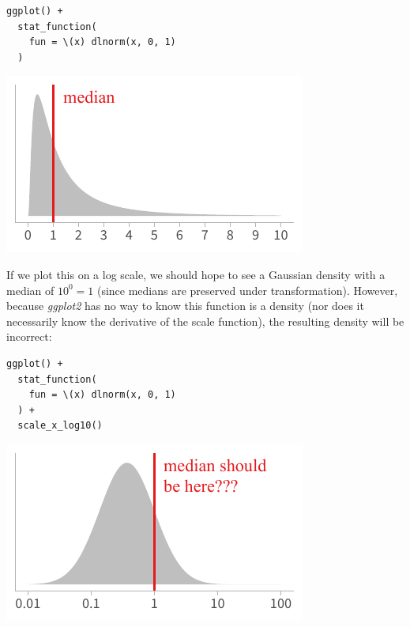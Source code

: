 \documentclass[journal]{vgtc}                     %
\begin{document}
\noindent
\begin{minipage}{.5\columnwidth}
\small
\begin{verbatim}
ggplot() +
  stat_function(
    fun = \(x) dlnorm(x, 0, 1)
  )
\end{verbatim}
\end{minipage}%
  \begin{minipage}{.4\columnwidth}
    \centering
    \includegraphics[width=1.2\columnwidth]{figs/3-jacobian-lognorm.pdf}
  \end{minipage}
\hfill\break


If we plot this on a log scale, we should hope to see a Gaussian density with a median of $10^0 = 1$ (since medians are preserved under transformation). However, because \textit{ggplot2} has no way to know this function is a density (nor does it necessarily know the derivative of the scale function), the resulting density will be incorrect:

\noindent
\begin{minipage}{.5\columnwidth}
\small
\begin{verbatim}
ggplot() +
  stat_function(
    fun = \(x) dlnorm(x, 0, 1)
  ) +
  scale_x_log10()
\end{verbatim}
\end{minipage}%
  \begin{minipage}{.4\columnwidth}
    \centering
    \includegraphics[width=1.2\columnwidth]{figs/3-jacobian-incorrect.pdf}
  \end{minipage}
\hfill\break
\end{document}
